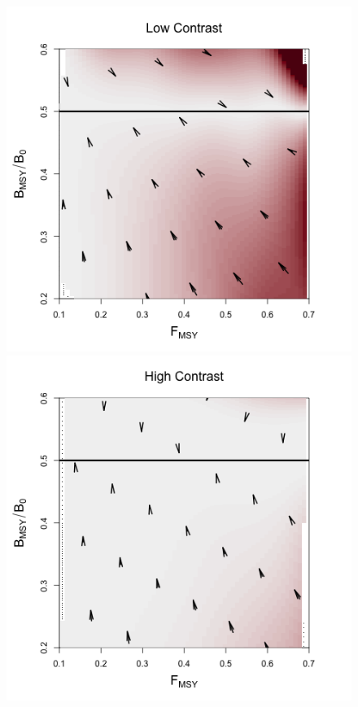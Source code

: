 \begin{figure}[h!]
\begin{minipage}[h!]{0.44\textwidth}
\includegraphics[width=\textwidth]{../ptNew/directionalBiasSubPTFlatT30.png}
\end{minipage}
\begin{minipage}[h!]{0.44\textwidth}
\includegraphics[width=\textwidth]{../ptNew/directionalBiasSubPTExpT45MinCon.png}

\end{minipage}
\end{figure}
